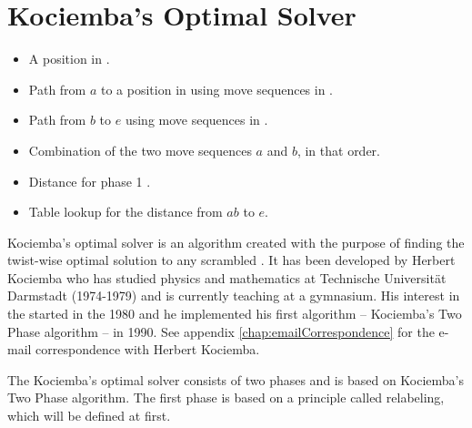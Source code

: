\section{Kociemba's Optimal Solver}
\label{sec:kociemba}
\begin{itemize}
\item {}A position in .
\item {}Path from $a$ to a position in  using move sequences in .
\item {}Path from $b$ to $e$ using move sequences in .
\item {}Combination of the two move sequences $a$ and $b$, in that order.
\item {}Distance for phase 1 .
\item {}Table lookup for the distance from $ab$ to $e$.
\end{itemize}
Kociemba's optimal solver is an algorithm created with the purpose of finding the twist-wise optimal solution to any scrambled \rubik{}\cite{kociemba09} \cite{cubelovers92}. It has been developed by Herbert Kociemba who has studied physics and mathematics at Technische Universit\"{a}t Darmstadt\cite{TUD} (1974-1979) and is currently teaching at a gymnasium. His interest in the \rubik{} started in the 1980 and he implemented his first algorithm -- Kociemba's Two Phase algorithm -- in 1990. See appendix  \ref{chap:emailCorrespondence} for the e-mail correspondence with Herbert Kociemba.

The Kociemba's optimal solver consists of two phases and is based on Kociemba's Two Phase algorithm. The first phase is based on a principle called relabeling, which will be defined at first. 


